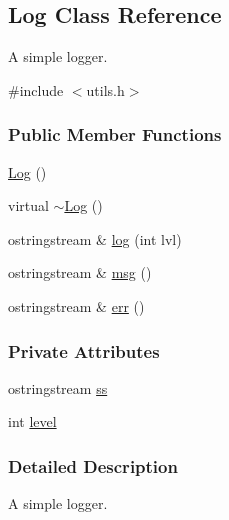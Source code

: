 \hypertarget{classLog}{\subsection{\-Log \-Class \-Reference}
\label{classLog}
}


\-A simple logger.  




{\ttfamily \#include $<$utils.\-h$>$}

\subsubsection*{\-Public \-Member \-Functions}
\begin{DoxyCompactItemize}
\item 
\hyperlink{classLog_af6071a60aa52b6c1b511f99b4bc1b8fe}{\-Log} ()
\item 
virtual \hyperlink{classLog_a0fbfda88fbee5027c89f6eb121059360}{$\sim$\-Log} ()
\item 
ostringstream \& \hyperlink{classLog_aced990b93fe6909dba24dff2aa1bf614}{log} (int lvl)
\item 
ostringstream \& \hyperlink{classLog_a6349b1e746ec28297140cfd36117fd2c}{msg} ()
\item 
ostringstream \& \hyperlink{classLog_ae376f858b6d341a6c0f4651855272e1f}{err} ()
\end{DoxyCompactItemize}
\subsubsection*{\-Private \-Attributes}
\begin{DoxyCompactItemize}
\item 
ostringstream \hyperlink{classLog_a7a55b3a5c26f17f7c26177302e12b433}{ss}
\item 
int \hyperlink{classLog_ae08b31307a81bbbf5eca98b027854506}{level}
\end{DoxyCompactItemize}


\subsubsection{\-Detailed \-Description}
\-A simple logger. 

